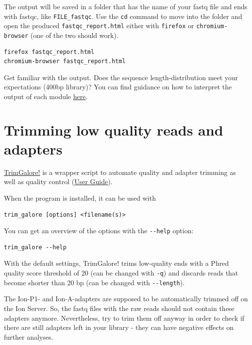 \documentclass[11pt]{article}
\begin{document}
The output will be saved in a folder that has the name of your fastq
file and ends with fastqc, like \texttt{FILE\_fastqc}. Use the \texttt{cd} command to
move into the folder and open the produced \texttt{fastqc\_report.html} either
with \texttt{firefox} or \texttt{chromium-browser} (one of the two should work). 

\begin{verbatim}
firefox fastqc_report.html
chromium-browser fastqc_report.html
\end{verbatim}

Get familiar with the output. Does the sequence length-distribution
meet your expectations (400bp library)? You can find guidance on how to 
interpret the output of each module \href{http://www.bioinformatics.babraham.ac.uk/projects/fastqc/Help/3\%20Analysis\%20Modules/}{here}.

\section{Trimming low quality reads and adapters}
\label{sec-3}


\href{http://www.bioinformatics.babraham.ac.uk/projects/trim_galore/}{TrimGalore!} is a wrapper script to automate quality and adapter
trimming as well as quality control (\href{http://www.bioinformatics.babraham.ac.uk/projects/trim_galore/trim_galore_User_Guide_v0.3.7.pdf}{User Guide}).

When the program is installed, it can be used with 

\begin{verbatim}
trim_galore [options] <filename(s)>
\end{verbatim}

You can get an overview of the options with the \texttt{-{}-help} option:

\begin{verbatim}
trim_galore --help
\end{verbatim}

With the default settings, TrimGalore! trims low-quality ends with a
Phred quality score threshold of 20 (can be changed with \texttt{-q}) and
discards reads that become shorter than 20 bp (can be changed with
\texttt{-{}-length}).

The Ion-P1- and Ion-A-adapters are supposed to be automatically
trimmed off on the Ion Server. So, the fastq files with the raw reads
should not contain these adapters anymore. Nevertheless, try to trim them
off anyway in order to check if there are still adapters left in your
library - they can have negative effects on further analyses.
\end{document}
